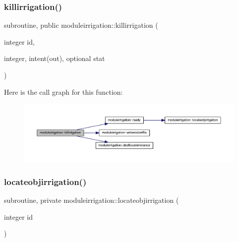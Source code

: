 \subsubsection{\texorpdfstring{killirrigation()}{killirrigation()}}
{\footnotesize\ttfamily subroutine, public moduleirrigation\+::killirrigation (\begin{DoxyParamCaption}\item[{integer}]{id,  }\item[{integer, intent(out), optional}]{stat }\end{DoxyParamCaption})}

Here is the call graph for this function\+:\nopagebreak
\begin{figure}[H]
\begin{center}
\leavevmode
\includegraphics[width=350pt]{namespacemoduleirrigation_acef69ff6504c99d5478be81efeab79fe_cgraph}
\end{center}
\end{figure}
\mbox{\label{namespacemoduleirrigation_ae56505ddeb0553538b6cc26774184d2a}} 
\subsubsection{\texorpdfstring{locateobjirrigation()}{locateobjirrigation()}}
{\footnotesize\ttfamily subroutine, private moduleirrigation\+::locateobjirrigation (\begin{DoxyParamCaption}\item[{integer}]{id }\end{DoxyParamCaption})\hspace{0.3cm}{\ttfamily [private]}}

